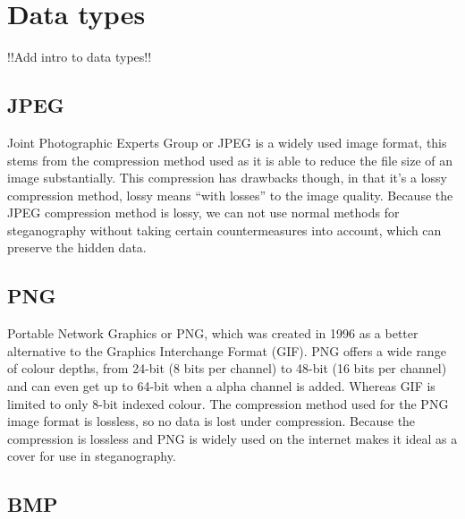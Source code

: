 \section{Data types}
!!Add intro to data types!!

\subsection{JPEG}
Joint Photographic Experts Group or JPEG is a widely used image format, this stems from the compression method used as it is able to reduce the file size of an image substantially.
This compression has drawbacks though, in that it's a lossy compression method, lossy means ``with losses'' to the image quality.
Because the JPEG compression method is lossy, we can not use normal methods for steganography without taking certain countermeasures into account, which can preserve the hidden data.
\iffalse{TODO: need to specify which countermeasures and rewrite the ending}\fi


\subsection{PNG}
Portable Network Graphics or PNG, which was created in 1996 as a better alternative to the Graphics Interchange Format (GIF).
PNG offers a wide range of colour depths, from 24-bit (8 bits per channel) to 48-bit (16 bits per channel) and can even get up to 64-bit when a alpha channel is added.
Whereas GIF is limited to only 8-bit indexed colour.
The compression method used for the PNG image format is lossless, so no data is lost under compression.
Because the compression is lossless and PNG is widely used on the internet makes it ideal as a cover for use in steganography.


\subsection{BMP}



